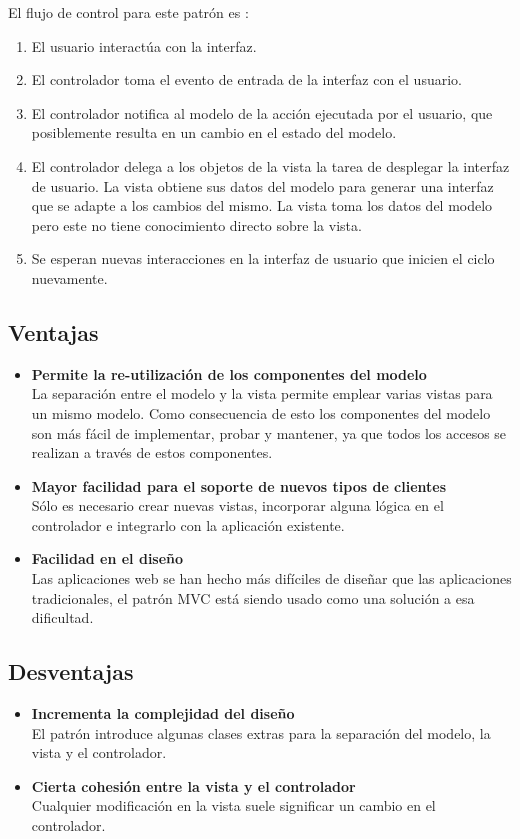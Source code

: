 El flujo de control para este patrón es \citep{MVC_WE2007}:
\begin{enumerate}
	\item El usuario interactúa con la interfaz.
	\item El controlador toma el evento de entrada de la interfaz con el usuario.
	\item El controlador notifica al modelo de la acción ejecutada por el usuario, que posiblemente resulta en un cambio en el estado del modelo.
	\item El controlador delega a los objetos de la vista la tarea de desplegar la interfaz de usuario. La vista obtiene sus datos del modelo para generar una interfaz que se adapte a los cambios del mismo. La vista toma los datos del modelo pero este no tiene conocimiento directo sobre la vista.
	\item Se esperan nuevas interacciones en la interfaz de usuario que inicien el ciclo nuevamente.
\end{enumerate}

\subsection {Ventajas}

\begin{itemize}
	\item \textbf{Permite la re-utilización de los componentes del modelo}\\
	La separación entre el modelo y la vista permite emplear varias vistas para un mismo modelo. Como consecuencia de esto los componentes del modelo son más fácil de implementar, probar y mantener, ya que todos los accesos se realizan a través de estos componentes.
	\item \textbf{Mayor facilidad para el soporte de nuevos tipos de clientes}\\
	Sólo es necesario crear nuevas vistas, incorporar alguna lógica en el controlador e integrarlo con la aplicación existente.
	\item \textbf{Facilidad en el diseño}\\
	Las aplicaciones web se han hecho más difíciles de diseñar que las aplicaciones tradicionales, el patrón MVC está siendo usado como una solución a esa dificultad.
\end{itemize}

\subsection {Desventajas}
\begin{itemize}
	\item \textbf{Incrementa la complejidad del diseño}\\
	El patrón introduce algunas clases extras para la separación del modelo, la vista y el controlador.
	\item \textbf{Cierta cohesión entre la vista y el controlador}\\
	Cualquier modificación en la vista suele significar un cambio en el controlador.
\end{itemize}

% 	
